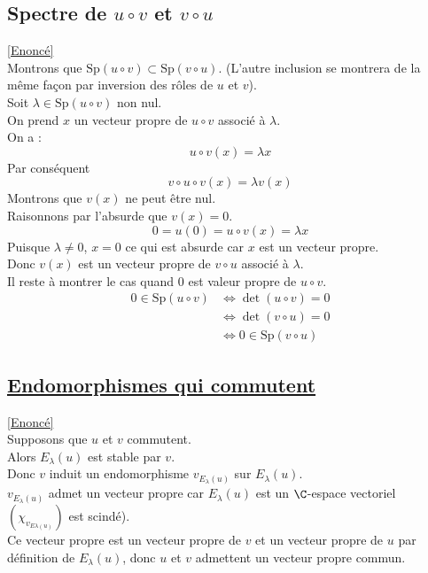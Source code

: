 \documentclass[8pt]{book}
\begin{document}
	\subsection{Spectre de $u\circ v$ et $v\circ u$ }
	\label{Spectre de uov et vou corrigé}
	\textcolor{blue}{\hyperref[Spectre de uov et vou]{[Enoncé]}}\\
	Montrons que $\text{Sp}(u\circ v)\subset \text{Sp}(v\circ u)$. (L'autre inclusion se montrera de la même façon par inversion des rôles de $u$ et $v$).\\
	Soit $\lambda\in\text{Sp}(u\circ v)$ non nul.\\
	On prend $x$ un vecteur propre de $u\circ v$ associé à $\lambda$.\\
	On a : \[u\circ v(x)=\lambda x\]
	Par conséquent \[v\circ u\circ v (x)=\lambda v(x)\]
	Montrons que $v(x)$ ne peut être nul.\\
	Raisonnons par l'absurde que $v(x)=0$.\\
	\[0=u(0)=u\circ v(x)=\lambda x \]
	Puisque $\lambda\ne0$, $x=0$ ce qui est absurde car $x$ est un vecteur propre.\\
	Donc $v(x)$ est un vecteur propre de $v\circ u$ associé à $\lambda$.\\
	Il reste à montrer le cas quand $0$ est valeur propre de $u\circ v$.\\
	\begin{align*}
		0\in \text{Sp}(u\circ v)&\Leftrightarrow \det(u\circ v)=0\\
		&\Leftrightarrow \det(v\circ u)=0\\
		&\Leftrightarrow 0\in \text{Sp}(v\circ u)
	\end{align*}
	
	\subsection{\underline{Endomorphismes qui commutent} }
	\label{Endomorphismes qui commutent corrigé}
	\textcolor{blue}{\hyperref[Endomorphismes qui commutent]{[Enoncé]}}\\
	Supposons que $u$ et $v$ commutent.\\
	Alors $E_\lambda(u)$ est stable par $v$.\\
	Donc $v$ induit un endomorphisme $v_{E_\lambda(u)}$ sur $E_\lambda(u)$.\\
	$v_{E_\lambda(u)}$ admet un vecteur propre car $E_\lambda(u)$ est un $\C$-espace vectoriel $(\chi_{v_{E\lambda(u)}})$ est scindé).\\
	Ce vecteur propre est un vecteur propre de $v$ et un vecteur propre de $u$ par définition de $E_\lambda(u)$, donc $u$ et $v$ admettent un vecteur propre commun.
	
\end{document}
